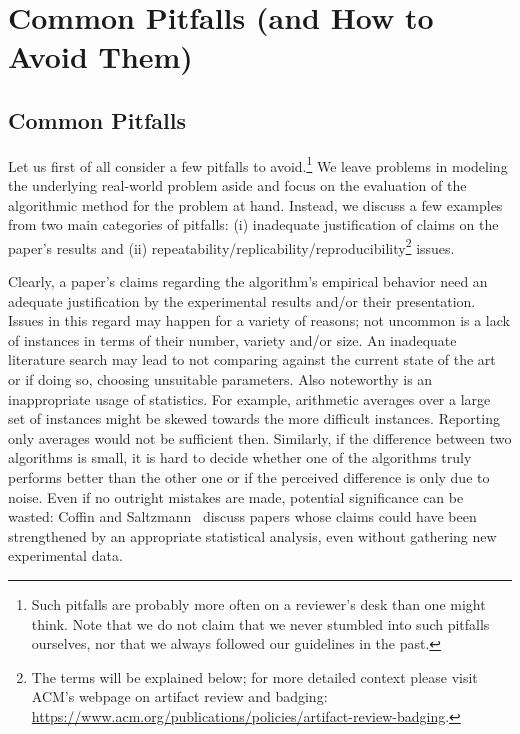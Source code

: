 \documentclass[algorithms,article,submit,moreauthors,pdftex]{Definitions/mdpi}
\newcounter{guideline}
\begin{document}
\section{Common Pitfalls (and How to Avoid Them)}
\label{sec:pitfalls-outline}
%
\subsection{Common Pitfalls}
\label{sub:pitfalls}
%
Let us first of all consider a few pitfalls to avoid.\footnote{Such pitfalls are probably more often on
a reviewer's desk than one might think.
Note that we do not claim that we never stumbled into such pitfalls ourselves, nor that we
always followed our guidelines in the past.
}
We leave problems in modeling the underlying real-world problem aside and
focus on the evaluation of the algorithmic method for the problem at hand.
%
Instead, we discuss a few examples from two main categories of pitfalls: (i) inadequate justification of claims on
the paper's results and (ii) repeatability/replicability/reproducibility\footnote{
The terms will be explained below; for more detailed context please visit ACM's webpage on
artifact review and badging: \url{https://www.acm.org/publications/policies/artifact-review-badging}.}
issues.

Clearly, a paper's claims regarding the algorithm's empirical behavior need an adequate justification
by the experimental results and/or their presentation.
Issues in this regard may happen for a variety of reasons; not uncommon is a lack of instances
in terms of their number, variety and/or size.
An inadequate literature search may lead to not comparing against the current state of the art or if doing so, choosing unsuitable parameters.
Also noteworthy is an inappropriate usage of statistics.
For example, arithmetic averages over a large set of instances might be skewed towards the more
difficult instances. Reporting only averages would not be sufficient then.
%
Similarly, if the difference between two algorithms is small, it is hard to decide
whether one of the algorithms truly performs better than the other one
or if the perceived difference is only due to noise.
%
Even if no outright mistakes are made, potential significance can be wasted:
Coffin and Saltzmann~\cite{Coffin00}
discuss papers whose claims could have been strengthened
by an appropriate statistical analysis,
even without gathering new experimental data.
\end{document}
